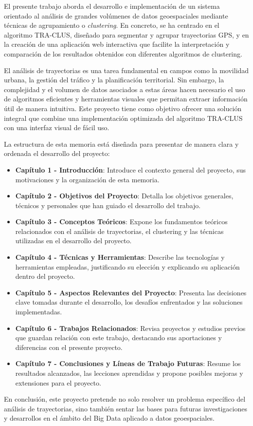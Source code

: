 
El presente trabajo aborda el desarrollo e implementación de un sistema orientado al análisis de grandes volúmenes de datos geoespaciales mediante técnicas de agrupamiento o \textit{clustering}. En concreto, se ha centrado en el algoritmo TRA-CLUS, diseñado para segmentar y agrupar trayectorias GPS, y en la creación de una aplicación web interactiva que facilite la interpretación y comparación de los resultados obtenidos con diferentes algoritmos de clustering.

El análisis de trayectorias es una tarea fundamental en campos como la movilidad urbana, la gestión del tráfico y la planificación territorial. Sin embargo, la complejidad y el volumen de datos asociados a estas áreas hacen necesario el uso de algoritmos eficientes y herramientas visuales que permitan extraer información útil de manera intuitiva. Este proyecto tiene como objetivo ofrecer una solución integral que combine una implementación optimizada del algoritmo TRA-CLUS con una interfaz visual de fácil uso.

La estructura de esta memoria está diseñada para presentar de manera clara y ordenada el desarrollo del proyecto:

\begin{itemize}
    \item \textbf{Capítulo 1 - Introducción}: Introduce el contexto general del proyecto, sus motivaciones y la organización de esta memoria.
    \item \textbf{Capítulo 2 - Objetivos del Proyecto}: Detalla los objetivos generales, técnicos y personales que han guiado el desarrollo del trabajo.
    \item \textbf{Capítulo 3 - Conceptos Teóricos}: Expone los fundamentos teóricos relacionados con el análisis de trayectorias, el clustering y las técnicas utilizadas en el desarrollo del proyecto.
    \item \textbf{Capítulo 4 - Técnicas y Herramientas}: Describe las tecnologías y herramientas empleadas, justificando su elección y explicando su aplicación dentro del proyecto.
    \item \textbf{Capítulo 5 - Aspectos Relevantes del Proyecto}: Presenta las decisiones clave tomadas durante el desarrollo, los desafíos enfrentados y las soluciones implementadas.
    \item \textbf{Capítulo 6 - Trabajos Relacionados}: Revisa proyectos y estudios previos que guardan relación con este trabajo, destacando sus aportaciones y diferencias con el presente proyecto.
    \item \textbf{Capítulo 7 - Conclusiones y Líneas de Trabajo Futuras}: Resume los resultados alcanzados, las lecciones aprendidas y propone posibles mejoras y extensiones para el proyecto.
\end{itemize}

En conclusión, este proyecto pretende no solo resolver un problema específico del análisis de trayectorias, sino también sentar las bases para futuras investigaciones y desarrollos en el ámbito del Big Data aplicado a datos geoespaciales.

